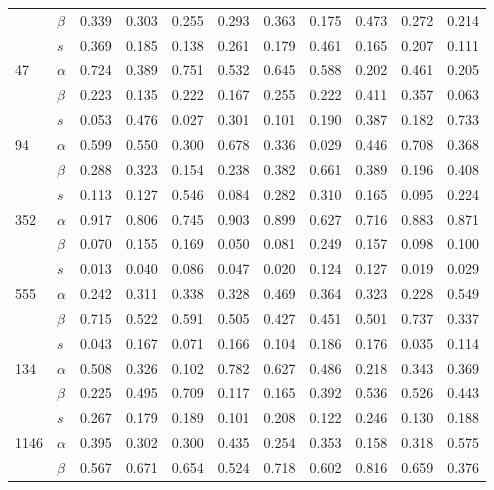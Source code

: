 \begin{longtable}{llrrrrrrrrr}
     & $\beta$ & 0.339 & 0.303 & 0.255 & 0.293 & 0.363 & 0.175 & 0.473 & 0.272 & 0.214 \\
     & $s$ & 0.369 & 0.185 & 0.138 & 0.261 & 0.179 & 0.461 & 0.165 & 0.207 & 0.111 \\
\cline{1-11}
\multirow{3}{*}{47} & $\alpha$ & 0.724 & 0.389 & 0.751 & 0.532 & 0.645 & 0.588 & 0.202 & 0.461 & 0.205 \\
     & $\beta$ & 0.223 & 0.135 & 0.222 & 0.167 & 0.255 & 0.222 & 0.411 & 0.357 & 0.063 \\
     & $s$ & 0.053 & 0.476 & 0.027 & 0.301 & 0.101 & 0.190 & 0.387 & 0.182 & 0.733 \\
\cline{1-11}
\multirow{3}{*}{94} & $\alpha$ & 0.599 & 0.550 & 0.300 & 0.678 & 0.336 & 0.029 & 0.446 & 0.708 & 0.368 \\
     & $\beta$ & 0.288 & 0.323 & 0.154 & 0.238 & 0.382 & 0.661 & 0.389 & 0.196 & 0.408 \\
     & $s$ & 0.113 & 0.127 & 0.546 & 0.084 & 0.282 & 0.310 & 0.165 & 0.095 & 0.224 \\
\cline{1-11}
\multirow{3}{*}{352} & $\alpha$ & 0.917 & 0.806 & 0.745 & 0.903 & 0.899 & 0.627 & 0.716 & 0.883 & 0.871 \\
     & $\beta$ & 0.070 & 0.155 & 0.169 & 0.050 & 0.081 & 0.249 & 0.157 & 0.098 & 0.100 \\
     & $s$ & 0.013 & 0.040 & 0.086 & 0.047 & 0.020 & 0.124 & 0.127 & 0.019 & 0.029 \\
\cline{1-11}
\multirow{3}{*}{555} & $\alpha$ & 0.242 & 0.311 & 0.338 & 0.328 & 0.469 & 0.364 & 0.323 & 0.228 & 0.549 \\
     & $\beta$ & 0.715 & 0.522 & 0.591 & 0.505 & 0.427 & 0.451 & 0.501 & 0.737 & 0.337 \\
     & $s$ & 0.043 & 0.167 & 0.071 & 0.166 & 0.104 & 0.186 & 0.176 & 0.035 & 0.114 \\
\cline{1-11}
\multirow{3}{*}{134} & $\alpha$ & 0.508 & 0.326 & 0.102 & 0.782 & 0.627 & 0.486 & 0.218 & 0.343 & 0.369 \\
     & $\beta$ & 0.225 & 0.495 & 0.709 & 0.117 & 0.165 & 0.392 & 0.536 & 0.526 & 0.443 \\
     & $s$ & 0.267 & 0.179 & 0.189 & 0.101 & 0.208 & 0.122 & 0.246 & 0.130 & 0.188 \\
\cline{1-11}
\multirow{3}{*}{1146} & $\alpha$ & 0.395 & 0.302 & 0.300 & 0.435 & 0.254 & 0.353 & 0.158 & 0.318 & 0.575 \\
     & $\beta$ & 0.567 & 0.671 & 0.654 & 0.524 & 0.718 & 0.602 & 0.816 & 0.659 & 0.376 \\

\end{longtable}
